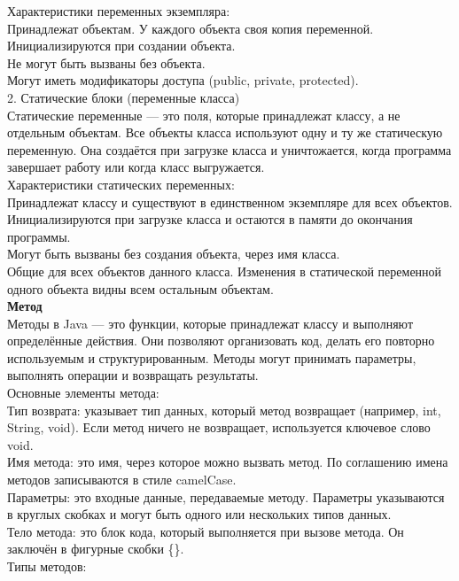 Характеристики переменных экземпляра: \\
Принадлежат объектам. У каждого объекта своя копия переменной. \\
Инициализируются при создании объекта. \\
Не могут быть вызваны без объекта. \\
Могут иметь модификаторы доступа (public, private, protected). \\
2. Статические блоки (переменные класса) \\
Статические переменные — это поля, которые принадлежат классу, а не отдельным объектам. Все объекты класса используют одну и ту же статическую переменную. Она создаётся при загрузке класса и уничтожается, когда программа завершает работу или когда класс выгружается. \\
Характеристики статических переменных: \\
Принадлежат классу и существуют в единственном экземпляре для всех объектов. \\
Инициализируются при загрузке класса и остаются в памяти до окончания программы. \\
Могут быть вызваны без создания объекта, через имя класса. \\
Общие для всех объектов данного класса. Изменения в статической переменной одного объекта видны всем остальным объектам. \\
\textbf{Метод} \\
Методы в Java — это функции, которые принадлежат классу и выполняют определённые действия. Они позволяют организовать код, делать его повторно используемым и структурированным. Методы могут принимать параметры, выполнять операции и возвращать результаты. \\
Основные элементы метода: \\
Тип возврата: указывает тип данных, который метод возвращает (например, int, String, void). Если метод ничего не возвращает, используется ключевое слово void. \\
Имя метода: это имя, через которое можно вызвать метод. По соглашению имена методов записываются в стиле camelCase. \\
Параметры: это входные данные, передаваемые методу. Параметры указываются в круглых скобках и могут быть одного или нескольких типов данных. \\
Тело метода: это блок кода, который выполняется при вызове метода. Он заключён в фигурные скобки \{\}. \\
Типы методов: \\
